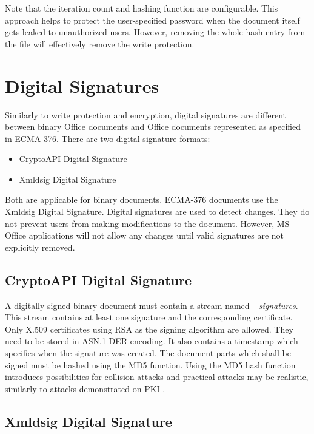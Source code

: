 \documentclass[11pt,oneside]{fithesis2}
\begin{document}
Note that the iteration count and hashing function are configurable. This approach helps to protect the user-specified password when the document itself gets leaked to unauthorized users. However, removing the whole hash entry from the file will effectively remove the write protection.

\section{Digital Signatures}\label{data_integrity}

Similarly to write protection and encryption, digital signatures are different between binary Office documents and Office documents represented as specified in ECMA-376. There are two digital signature formats:

\begin{itemize}
\setlength\itemsep{0.1em}
	\item{CryptoAPI Digital Signature}
	\item{Xmldsig Digital Signature}
\end{itemize}

Both are applicable for binary documents. ECMA-376 documents use the Xmldsig Digital Signature. Digital signatures are used to detect changes. They do not prevent users from making modifications to the document. However, MS Office applications will not allow any changes until valid signatures are not explicitly removed.

\subsection{CryptoAPI Digital Signature} 

A digitally signed binary document must contain a stream named \textit{\_signatures}. This stream contains at least one signature and the corresponding certificate. Only X.509 certificates using RSA as the signing algorithm are allowed. They need to be stored in ASN.1 DER encoding. It also contains a timestamp which specifies when the signature was created. The document parts which shall be signed must be hashed using the MD5 function. Using the MD5 hash function introduces possibilities for collision attacks and practical attacks may be realistic, similarly to attacks demonstrated on PKI \cite{md5_vulnerable}. 


\subsection{Xmldsig Digital Signature}
\end{document}
